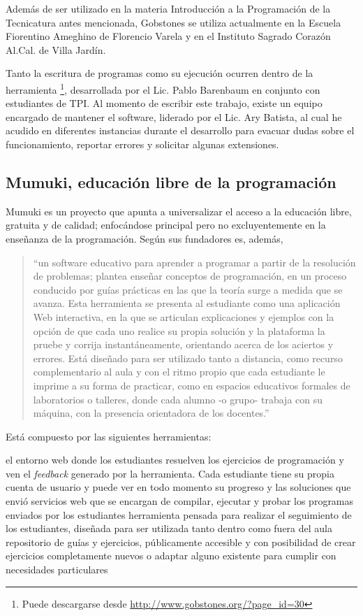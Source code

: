 Además de ser utilizado en la materia Introducción a la Programación de la Tecnicatura antes mencionada, Gobstones se utiliza actualmente en la Escuela Fiorentino Ameghino de Florencio Varela y en el Instituto Sagrado Corazón Al.Cal. de Villa Jardín.

Tanto la escritura de programas como su ejecución ocurren dentro de la herramienta \footnote{Puede descargarse desde \url{http://www.gobstones.org/?page_id=30}}, desarrollada por el Lic. Pablo Barenbaum en conjunto con estudiantes de TPI. Al momento de escribir este trabajo, existe un equipo encargado de mantener el software, liderado por el Lic. Ary Batista, al cual he acudido en diferentes instancias durante el desarrollo para evacuar dudas sobre el funcionamiento, reportar errores y solicitar algunas extensiones.

\subsection{Mumuki, educación libre de la programación}
Mumuki es un proyecto que apunta a universalizar el acceso a la educación libre, gratuita y de calidad; enfocándose principal pero no excluyentemente en la enseñanza de la programación. Según sus fundadores es, además,

\begin{quote}
``un software educativo para aprender a programar a partir de la resolución de problemas; plantea enseñar conceptos de programación, en un proceso conducido por guías prácticas en las que la teoría surge a medida que se avanza. Esta herramienta se presenta al estudiante como una aplicación Web interactiva, en la que se articulan explicaciones y ejemplos con la opción de que cada uno realice su propia solución y la plataforma la pruebe y corrija instantáneamente, orientando acerca de los aciertos y errores. Está diseñado para ser utilizado tanto a distancia, como recurso complementario al aula y con el ritmo propio que cada estudiante le imprime a su forma de practicar, como en espacios educativos formales de laboratorios o talleres, donde cada alumno -o grupo- trabaja con su máquina, con la presencia orientadora de los docentes.''\cite{PaperMumuki}
\end{quote}

Está compuesto por las siguientes herramientas:
\begin{itemize}
   el entorno web donde los estudiantes resuelven los ejercicios de programación y ven el \textit{feedback} generado por la herramienta. Cada estudiante tiene su propia cuenta de usuario y puede ver en todo momento su progreso y las soluciones que envió
   servicios web que se encargan de compilar, ejecutar y probar los programas enviados por los estudiantes
   herramienta pensada para realizar el seguimiento de los estudiantes, diseñada para ser utilizada tanto dentro como fuera del aula
   repositorio de guías y ejercicios, públicamente accesible y con posibilidad de crear ejercicios completamente nuevos o adaptar alguno existente para cumplir con necesidades particulares
\end{itemize}

